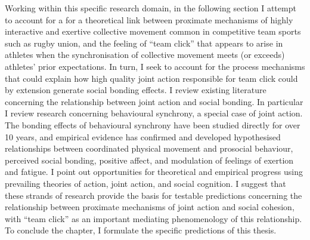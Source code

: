 \begin{mccorrection}
  Working within this specific research domain, in the following section I attempt to account for a for a theoretical link between proximate mechanisms of highly interactive and exertive collective movement common in competitive team sports such as rugby union, and the feeling of ``team click'' that appears to arise in athletes when the synchronisation of collective movement meets (or exceeds) athletes' prior expectations. In turn, I seek to account for the process mechanisms that could explain how high quality joint action responsible for team click could by extension generate social bonding effects.  I review existing literature concerning the relationship between joint action and social bonding. In particular I review research concerning behavioural synchrony, a special case of joint action. The bonding effects of behavioural synchrony have been studied directly for over 10 years, and empirical evidence has confirmed and developed hypothesised relationships between coordinated physical movement and prosocial behaviour, perceived social bonding, positive affect, and modulation of feelings of exertion and fatigue.
  I point out opportunities for theoretical and empirical progress using prevailing theories of action, joint action, and social cognition. I suggest that these strands of research provide the basis for testable predictions concerning the relationship between proximate mechanisms of joint action and social cohesion, with ``team click'' as an important mediating phenomenology of this relationship.  To conclude the chapter, I formulate the specific predictions of this thesis.
\end{mccorrection}


\clearpage
